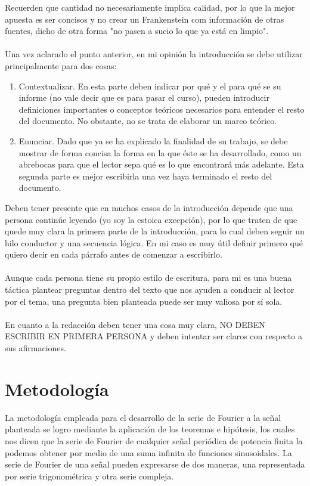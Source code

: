 \documentclass[12pt]{article}
\begin{document}
    Recuerden que cantidad no necesariamente implica calidad, por lo que la mejor apuesta 
    es ser concisos y no crear un Frankenstein com información de otras fuentes, dicho de 
    otra forma "no pasen a sucio lo que ya está en limpio".\\
    \\
    Una vez aclarado el punto anterior, en mi opinión la introducción se debe utilizar 
    principalmente para dos cosas:
    \begin{enumerate}
        \item Contextualizar. En esta parte deben indicar por qué y el para qué se su informe 
        (no vale decir que es para pasar el curso), pueden introducir definiciones 
        importantes o conceptos teóricos necesarios para entender el resto del 
        documento. No obstante, no se trata de elaborar un marco teórico.

        \item Enunciar. Dado que ya se ha explicado la finalidad de su trabajo, se debe mostrar 
        de forma concisa la forma en la que éste se ha desarrollado, como un abrebocas 
        para que el lector sepa qué es lo que encontrará más adelante. Esta segunda 
        parte es mejor escribirla una vez haya terminado el resto del documento.
    \end{enumerate}
    Deben tener presente que en muchos casos de la introducción depende que una persona 
    continúe leyendo (yo soy la estoica excepción), por lo que traten de que quede muy clara la 
    primera parte de la introducción, para lo cual deben seguir un hilo conductor y una 
    secuencia lógica. En mi caso es muy útil definir primero qué quiero decir en cada párrafo 
    antes de comenzar a escribirlo.\\
    \\
    Aunque cada persona tiene su propio estilo de escritura, para mi es una buena táctica 
    plantear preguntas dentro del texto que nos ayuden a conducir al lector por el tema, una 
    pregunta bien planteada puede ser muy valiosa por sí sola.\\
    \\
    En cuanto a la redacción deben tener una cosa muy clara, NO DEBEN ESCRIBIR EN 
    PRIMERA PERSONA y deben intentar ser claros con respecto a sus afirmaciones.
    
\section*{Metodología}
    La metodología empleada para el desarrollo de la serie de Fourier a la señal planteada se 
    logro mediante la aplicación de los teoremas e hipótesis, los cuales nos dicen que la serie 
    de Fourier de cualquier señal periódica de potencia finita la podemos obtener por medio de una
    suma infinita de funciones sinusoidales. La serie de Fourier de una señal pueden expresarse de 
    dos maneras, una representada por serie trigonométrica y otra serie compleja.
\end{document}
